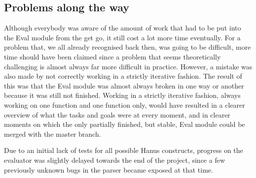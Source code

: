\documentclass[12pt,a4paper]{article}
\begin{document}
    \subsection{Problems along the way}
        Although everybody was aware of the amount of work that had to be put into the Eval module from the get go, it still cost a lot more time eventually. For a problem that, we all already recognised back then, was going to be difficult, more time should have been claimed since a problem that seems theoretically challenging is almost always far more difficult in practice. However, a mistake was also made by not correctly working in a strictly iterative fashion. The result of this was that the Eval module was almost always broken in one way or another because it was still not finished. Working in a strictly iterative fashion, always working on one function and one function only, would have resulted in a clearer overview of what the tasks and goals were at every moment, and in clearer moments on which the only partially finished, but stable, Eval module could be merged with the master branch.
        
Due to an initial lack of tests for all possible Hanus constructs, progress on the evaluator was slightly delayed towards the end of the project, since a few previously unknown bugs in the parser became exposed at that time. 
\end{document}
